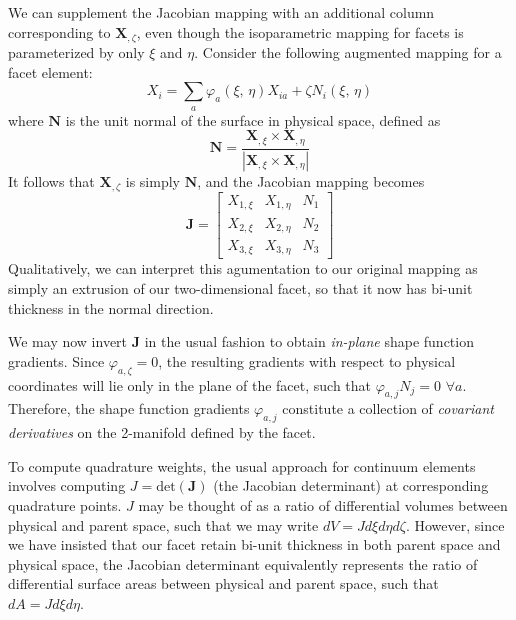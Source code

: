 \documentclass[11pt]{article} %
\begin{document}
We can supplement the Jacobian mapping with an additional column corresponding to $\mathbf{X}_{,\zeta}$, even though the isoparametric mapping for facets is parameterized by only $\xi$ and $\eta$. Consider the following augmented mapping for a facet element:
\begin{equation}
	X_i = \sum_a \varphi_a (\xi, \, \eta) X_{ia} + \zeta N_i (\xi, \, \eta)
\end{equation}
where $\mathbf{N}$ is the unit normal of the surface in physical space, defined as
\begin{equation}
	\mathbf{N} = \frac{\mathbf{X}_{,\xi} \times \mathbf{X}_{,\eta}}{\left| \mathbf{X}_{,\xi} \times \mathbf{X}_{,\eta} \right|}
\end{equation}
It follows that $\mathbf{X}_{,\zeta}$ is simply $\mathbf{N}$, and the Jacobian mapping becomes
\begin{equation}
	\mathbf{J} = \left[ \begin{array}{ccc} X_{1,\xi} & X_{1,\eta} & N_1 \\ X_{2,\xi} & X_{2,\eta} & N_2 \\ X_{3,\xi} & X_{3,\eta} & N_3 \end{array} \right]
\end{equation}
Qualitatively, we can interpret this agumentation to our original mapping as simply an extrusion of our two-dimensional facet, so that it now has bi-unit thickness in the normal direction.

We may now invert $\mathbf{J}$ in the usual fashion to obtain \textit{in-plane} shape function gradients. Since $\varphi_{a,\zeta} = 0$, the resulting gradients with respect to physical coordinates will lie only in the plane of the facet, such that $\varphi_{a,j} N_j = 0 \, \, \forall a$. Therefore, the shape function gradients $\varphi_{a,j}$ constitute a collection of \textit{covariant derivatives} on the 2-manifold defined by the facet.

To compute quadrature weights, the usual approach for continuum elements involves computing $J = \mbox{det} (\mathbf{J})$ (the Jacobian determinant) at corresponding quadrature points. $J$ may be thought of as a ratio of differential volumes between physical and parent space, such that we may write $dV = J d\xi d\eta d\zeta$. However, since we have insisted that our facet retain bi-unit thickness in both parent space and physical space, the Jacobian determinant equivalently represents the ratio of differential surface areas between physical and parent space, such that $dA = J d\xi d\eta$.
\end{document}
